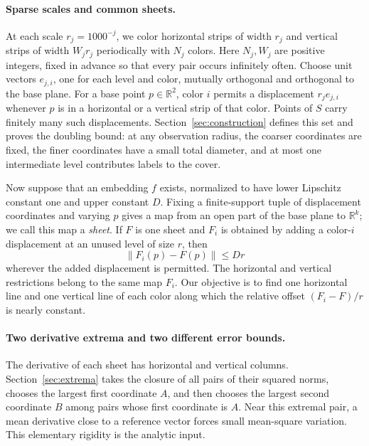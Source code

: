 \documentclass[11pt]{article}
\newcommand{\R}{\mathbb R}
\newcommand{\norm}[1]{\left\lVert#1\right\rVert}
\begin{document}
\paragraph{Sparse scales and common sheets.}
At each scale $r_j=1000^{-j}$, we color horizontal strips of width $r_j$ and vertical strips of width $W_jr_j$ periodically with $N_j$ colors. Here $N_j,W_j$ are positive integers, fixed in advance so that every pair occurs infinitely often. Choose unit vectors $e_{j,i}$, one for each level and color, mutually orthogonal and orthogonal to the base plane. For a base point $p\in\R^2$, color $i$ permits a displacement $r_je_{j,i}$ whenever $p$ is in a horizontal or a vertical strip of that color. Points of $S$ carry finitely many such displacements. Section~\ref{sec:construction} defines this set and proves the doubling bound: at any observation radius, the coarser coordinates are fixed, the finer coordinates have a small total diameter, and at most one intermediate level contributes labels to the cover.

Now suppose that an embedding $f$ exists, normalized to have lower Lipschitz constant one and upper constant $D$. Fixing a finite-support tuple of displacement coordinates and varying $p$ gives a map from an open part of the base plane to $\R^k$; we call this map a \emph{sheet}. If $F$ is one sheet and $F_i$ is obtained by adding a color-$i$ displacement at an unused level of size $r$, then
\[
 \norm{F_i(p)-F(p)}\le Dr
\]
wherever the added displacement is permitted. The horizontal and vertical restrictions belong to the same map $F_i$. Our objective is to find one horizontal line and one vertical line of each color along which the relative offset $(F_i-F)/r$ is nearly constant.

\paragraph{Two derivative extrema and two different error bounds.}
The derivative of each sheet has horizontal and vertical columns. Section~\ref{sec:extrema} takes the closure of all pairs of their squared norms, chooses the largest first coordinate $A$, and then chooses the largest second coordinate $B$ among pairs whose first coordinate is $A$. Near this extremal pair, a mean derivative close to a reference vector forces small mean-square variation. This elementary rigidity is the analytic input.
\end{document}
